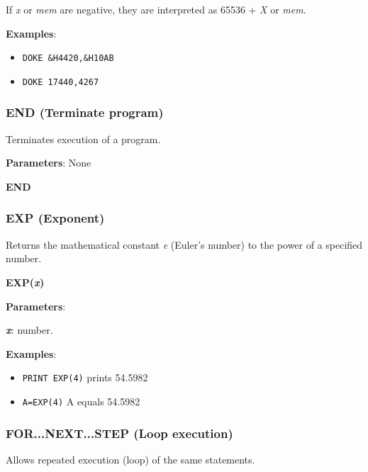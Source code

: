     If \textit{x} or \textit{mem} are negative, they are interpreted as 65536 +
    \textit{X} or \textit{mem}.

    \textbf{Examples}:
    \begin{itemize}
        \item \texttt{DOKE \&H4420,\&H10AB}
        \item \texttt{DOKE 17440,4267}
    \end{itemize}

    \subsubsection{{END (Terminate program)}}
    \label{msbasic:lang:end}
    Terminates execution of a program.

    \textbf{Parameters}: None

    \hspace{1.9cm}\textbf{END}

    \subsubsection{{EXP (Exponent)}}
    \label{msbasic:lang:exp}
    Returns the mathematical constant \textit{e} (Euler’s number) to the power
    of a specified number.

    \hspace{1.9cm}\textbf{EXP(\textit{x})}

    \textbf{Parameters}:

    \hspace{1cm}\textbf{\textit{x}}: number.

    \textbf{Examples}:
    \begin{itemize}
        \item \texttt{PRINT EXP(4)} prints 54.5982
        \item \texttt{A=EXP(4)} A equals 54.5982
    \end{itemize}

    \subsubsection{{FOR...NEXT...STEP (Loop execution)}}
    \label{msbasic:lang:fornext}
    Allows repeated execution (loop) of the same statements.

